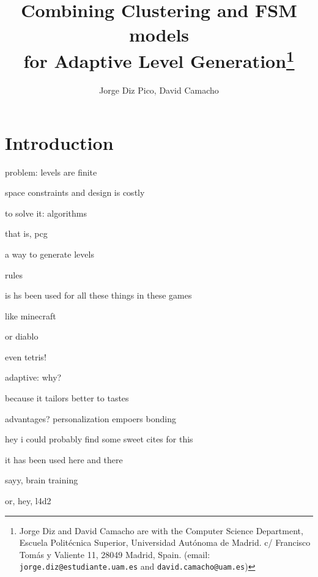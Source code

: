 \documentclass[conference]{IEEEtran}
\begin{document}
\title{\ \\ \LARGE\bf Combining Clustering and FSM models \\ for Adaptive Level Generation\thanks{Jorge Diz and David Camacho are with the Computer Science Department, Escuela Politécnica Superior, Universidad Autónoma de Madrid. c/ Francisco Tomás y Valiente 11, 28049 Madrid, Spain. (email: {\tt jorge.diz@estudiante.uam.es} and {\tt david.camacho@uam.es})}}

\author{Jorge Diz Pico, David Camacho}


\maketitle

\begin{abstract}

\end{abstract}


\section{Introduction}

problem: levels are finite

space constraints and design is costly

to solve it: algorithms

that is, pcg

a way to generate levels

rules

is hs been used for all these things in these games

like minecraft

or diablo

even tetris!

adaptive: why?

because it tailors better to tastes

advantages? personalization empoers bonding

hey i could probably find some sweet cites for this

it has been used here and there

sayy, brain training

or, hey, l4d2
\end{document}
